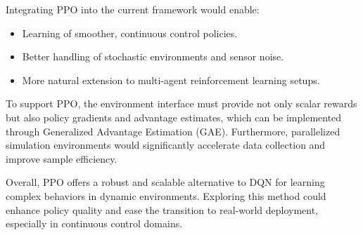 Integrating PPO into the current framework would enable:
\begin{itemize}
  \item Learning of smoother, continuous control policies.
  \item Better handling of stochastic environments and sensor noise.
  \item More natural extension to multi-agent reinforcement learning setups.
\end{itemize}

To support PPO, the environment interface must provide not only scalar rewards but also policy gradients and advantage estimates, which can be implemented through Generalized Advantage Estimation (GAE). Furthermore, parallelized simulation environments would significantly accelerate data collection and improve sample efficiency.

Overall, PPO offers a robust and scalable alternative to DQN for learning complex behaviors in dynamic environments. Exploring this method could enhance policy quality and ease the transition to real-world deployment, especially in continuous control domains.
